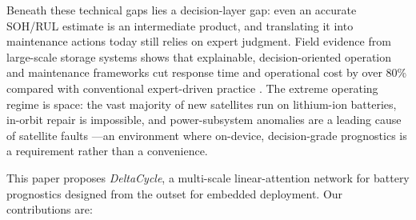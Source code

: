 Beneath these technical gaps lies a decision-layer gap: even an
accurate SOH/RUL estimate is an intermediate product, and translating
it into maintenance actions today still relies on expert judgment.
Field evidence from large-scale storage systems shows that
explainable, decision-oriented operation and maintenance frameworks
cut response time and operational cost by over 80\% compared with
conventional expert-driven practice \cite{ref_qu_bess}. The extreme
operating regime is space: the vast majority of new satellites run
on lithium-ion batteries, in-orbit repair is impossible, and
power-subsystem anomalies are a leading cause of satellite faults
\cite{ref_sbarra_dt}---an environment where on-device, decision-grade
prognostics is a requirement rather than a convenience.

This paper proposes \emph{DeltaCycle}, a multi-scale linear-attention
network for battery prognostics designed from the outset for embedded
deployment. Our contributions are:

